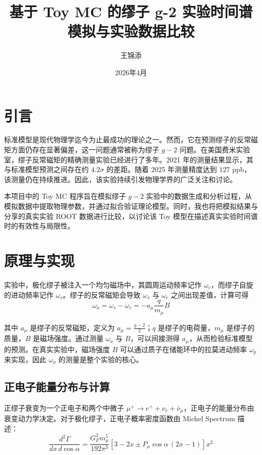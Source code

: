 \documentclass[a4paper,11pt,AutoFakeBold]{ctexart}
\title{\textbf{基于 Toy MC 的缪子 g-2 实验时间谱模拟与实验数据比较}}
\author{王锦添}
\date{2026年4月}
\begin{document}
\maketitle

\pagestyle{fancy}       %

\section{引言}

标准模型是现代物理学迄今为止最成功的理论之一\cite{BOSTON2023}。然而，它在预测缪子的反常磁矩方面仍存在显著偏差，这一问题通常被称为缪子 $g-2$ 问题。在美国费米实验室，缪子反常磁矩的精确测量实验已经进行了多年。2021 年的测量结果显示，其与标准模型预测之间存在约 $4.2\sigma$ 的差距\cite{Li2022Muon}。随着 2025 年测量精度达到 $127$ ppb，该测量仍在持续推进\cite{7clf-sm2v}。因此，该实验持续引发物理学界的广泛关注和讨论。

本项目中的 Toy MC 程序旨在模拟缪子 $g-2$ 实验中的数据生成和分析过程，从模拟数据中提取物理参数，并通过拟合验证理论模型。同时，我也将把模拟结果与分享的真实实验 ROOT 数据进行比较，以讨论该 Toy 模型在描述真实实验时间谱时的有效性与局限性。

\section{原理与实现}

实验中，极化缪子被注入一个均匀磁场中，其圆周运动频率记作 $\omega_c$，而缪子自旋的进动频率记作 $\omega_s$。缪子的反常磁矩会导致 $\omega_s$ 与 $\omega_c$ 之间出现差值，计算可得\cite{PhysRevA103}
\begin{equation}
\omega_a = \omega_s - \omega_c = - a_\mu \frac{q}{m_\mu} B
\end{equation}

其中 $a_\mu$ 是缪子的反常磁矩，定义为\cite{BOSTON2023} $ a_\mu = \frac{g-2}{2}$；$q$ 是缪子的电荷量，$m_\mu$ 是缪子的质量，$B$ 是磁场强度。通过测量 $\omega_a$ 与 $B$，可以间接测得 $a_\mu$，从而检验标准模型的预测。在真实实验中，磁场强度 $B$ 可以通过质子在储能环中的拉莫进动频率 $\omega_p$ 来实现\cite{Chu2021Muon}，因此 $\omega_a$ 的测量是整个实验的核心。

\subsection{正电子能量分布与计算}

正缪子衰变为一个正电子和两个中微子 $\mu^+ \to e^+ + \nu_e + \bar{\nu}_\mu$，正电子的能量分布由衰变动力学决定。对于极化缪子，正电子概率密度函数由 Michel Spectrum 描述\cite{Fetscher2019MuonDecay}：
\begin{equation}
\frac{d^2 \Gamma}{dx\, d\cos\alpha}
=
\frac{G_F^2 m_\mu^5}{192\pi^3}
\left[
3 - 2x \pm P_\mu \cos\alpha\,(2x - 1)
\right] x^2
\end{equation}
\end{document}
